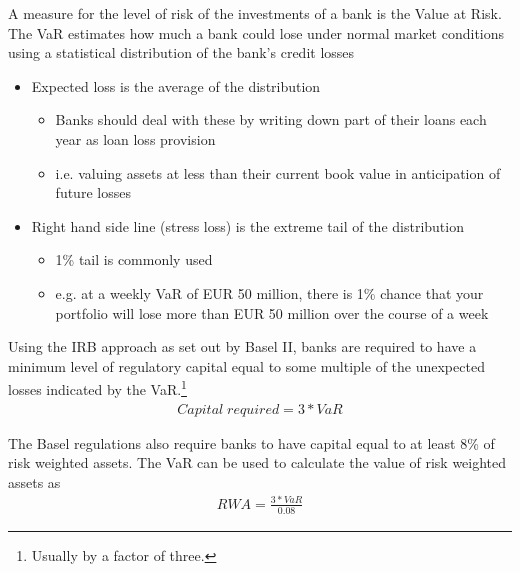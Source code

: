 \documentclass{beamer}
\begin{document}
\begin{frame}
  A measure for the level of risk of the investments of a bank is the Value at Risk. 
The VaR estimates how much a bank could lose under normal market conditions using a statistical distribution of the bank's credit losses 
\begin{itemize}
  \item Expected loss is the average of the distribution 
  \begin{itemize}
    \item Banks should deal with these by writing down part of their loans each year as loan loss provision
    \item i.e. valuing assets at less than their current book value in anticipation of future losses
  \end{itemize}
  \item Right hand side line (stress loss) is the extreme tail of the distribution
  \begin{itemize}
    \item 1\% tail is commonly used
    \item e.g. at a weekly VaR of EUR 50 million, there is  1\% chance that your portfolio will lose more than EUR 50 million over the course of a week 
  \end{itemize}
\end{itemize}
\end{frame}

\begin{frame}
  Using the IRB approach as set out by Basel II, banks are required to have a minimum level of regulatory capital equal to some multiple of the unexpected losses indicated by the VaR.\footnote{Usually by a factor of three.}
\begin{align*} 
    Capital \; required = 3* VaR 
\end{align*}

The Basel regulations also require banks to have capital equal to at least 8\% of risk weighted assets.
The VaR can be used to calculate the value of risk weighted assets as 
\begin{align*} 
  RWA=\frac{3*VaR}{0.08} 
\end{align*}

\end{frame}
\end{document}
